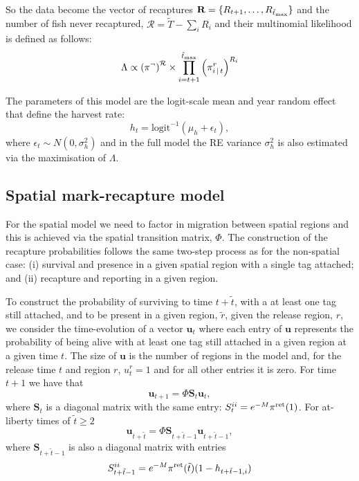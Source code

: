 \documentclass[12pt,a4paper,twoside,times,sky,standard]{csiroreport2017}
\newcommand{\ds}{\displaystyle}
\newcommand{\eps}{\epsilon}
\newcommand{\tr}{\tilde{r}}
\newcommand{\ttt}{\tilde{t}}
\newcommand{\ttmax}{\tilde{t}_{\rm max}}
\newcommand{\piret}{\pi^{\rm ret}}
\newcommand{\uu}{\mathbf{u}}
\begin{document}
So the data become the vector of recaptures $\mathbf{R}=\{R_{t+1},\hdots,R_{\ttmax}\}$ and the number of fish never recaptured, $\mathcal{R}=\tilde{T}-\sum_i R_i$ and their multinomial likelihood is defined as follows:
\begin{equation*}
    \ds \Lambda \propto \left(\pi^{\neg}\right)^{\mathcal{R}}\times\prod\limits_{i=t+1}^{\ttmax}\left(\pi^r_{i\,|\,t}\right)^{R_i}
\end{equation*}

The parameters of this model are the logit-scale mean and year random effect that define the harvest rate:
\begin{equation*}
    \ds h_t = \textrm{logit}^{-1}\left(\mu_h+\eps_t\right),
\end{equation*}
where $\eps_t\sim N(0,\sigma^2_h)$ and in the full model the RE variance $\sigma^2_h$ is also estimated via the maximisation of $\Lambda$.

\subsection*{Spatial mark-recapture model}

For the spatial model we need to factor in migration between spatial regions and this is achieved via the spatial transition matrix, $\Phi$. The construction of the recapture probabilities follows the same two-step process as for the non-spatial case: (i) survival and presence in a given spatial region with a single tag attached; and (ii) recapture and reporting in a given region.

To construct the probability of surviving to time $t+\ttt$, with a at least one tag still attached, and to be present in a given region, $\tr$, given the release region, $r$, we consider the time-evolution of a vector $\uu_t$ where each entry of $\uu$ represents the probability of being alive with at least one tag still attached in a given region at a given time $t$. The size of $\uu$ is the number of regions in the model and, for the release time $t$ and region $r$, $u^r_t=1$ and for all other entries it is zero. For time $t+1$ we have that
\begin{equation*}
    \ds \uu_{t+1}=\Phi\mathbf{S}_t\uu_t,
\end{equation*}
where $\mathbf{S}_t$ is a diagonal matrix with the same entry: $S^{ii}_t=e^{-M}\piret(1)$. For at-liberty times of $\ttt\geq2$
\begin{equation*}
    \ds \uu_{t+\ttt}=\Phi\mathbf{S}_{t+\ttt-1}\uu_{t+\ttt-1},
\end{equation*}
where $\mathbf{S}_{t+\ttt-1}$ is also a diagonal matrix with entries
\begin{equation*}
    \ds S^{ii}_{t+\ttt-1}=e^{-M}\piret(\ttt)(1-h_{t+\ttt-1,i})
\end{equation*}
\end{document}
